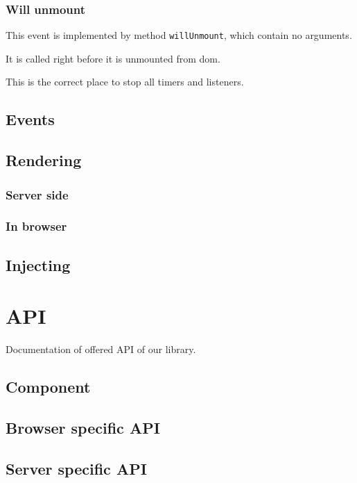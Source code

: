     \subsubsection{Will unmount}\label{subsec:our-architecture-lifecycle-willunmount}

      This event is implemented by method \texttt{willUnmount}, which contain no arguments.
      
      It is called right before it is unmounted from dom. 

      This is the correct place to stop all timers and listeners.
      

  \subsection{Events}\label{subsec:our-architecture-events}
  \subsection{Rendering}\label{subsec:our-architecture-rendering}
  \subsubsection{Server side}\label{subsec:our-architecture-rendering-server}
  \subsubsection{In browser}\label{subsec:our-architecture-rendering-browser}
  \subsection{Injecting}\label{subsec:our-architecture-injecting}

\section{API}\label{sec:our-api}

  Documentation of offered API of our library.

  \subsection{Component}\label{subsec:our-api-component}
  \subsection{Browser specific API}\label{subsec:our-api-browser}
  \subsection{Server specific API}\label{subsec:our-api-server}
